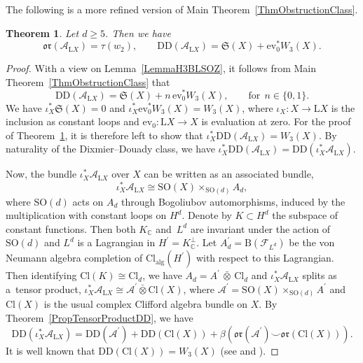 \documentclass[pdftex]{sigma}
\numberwithin{equation}{section}
\newtheorem{Theorem}{Theorem}[section]
\newcommand{\C}{\mathbb{C}}
\newcommand{\B}{\mathrm{B}}
\newcommand{\A}{\mathcal{A}}
\newcommand{\Cl}{\mathrm{Cl}}
\newcommand{\SO}{\mathrm{SO}}
\renewcommand{\L}{\mathrm{L}}
\newcommand{\DD}{\mathrm{DD}}
\newcommand{\oclass}{\mathfrak{or}}
\begin{document}
The following is a more refined version of Main Theorem~\ref{ThmObstructionClass}.

\begin{Theorem} \label{ThmRepeatedMain}
Let $d\geq 5$. Then we have
\begin{equation*}
\oclass(\A_{\L X}) = \tau(w_2), \qquad \DD(\A_{\L X}) = \mathfrak{S}(X) + \mathrm{ev}_0^*W_3(X).
\end{equation*}
\end{Theorem}

\begin{proof}
With a view on Lemma~\ref{LemmaH3BLSOZ}, it follows from Main Theorem~\ref{ThmObstructionClass} that
\begin{equation*}
\DD(\mathcal{A}_{\L X}) = \mathfrak{S}(X) + n \, \mathrm{ev}_0^*W_3(X), \qquad \text{for}~~n \in \{0, 1\}.
\end{equation*}
We have $\iota_X^* \mathfrak{S}(X) = 0$ and $\iota_X^*\mathrm{ev}_0^*W_3(X) = W_3(X)$, where $\iota_X \colon X \to \L X$ is the inclusion as constant loops and $\mathrm{ev}_0 \colon \L X \to X$ is evaluation at zero.
For the proof of Theorem~\ref{ThmRepeatedMain}, it is therefore left to show that $\iota_X^* \DD(\mathcal{A}_{\L X}) = W_3(X)$.
By naturality of the Dixmier--Douady class, we have $\iota_X^* \DD(\mathcal{A}_{\L X}) = \DD(\iota_X^*\mathcal{A}_{\L X})$.

Now, the bundle $\iota_X^*\mathcal{A}_{\L X}$ over $X$ can be written as an associated bundle,
\begin{equation*}
 \iota_X^*\mathcal{A}_{\L X} \cong \SO(X) \times_{\SO(d)} A_d,
\end{equation*}
where $\SO(d)$ acts on $A_d$ through Bogoliubov automorphisms, induced by the multiplication with constant loops on $H^d$.
Denote by $K\subset H^d$ the subspace of constant functions.
Then both $K_\C$ and~$L^d$ are invariant under the action of $\SO(d)$ and $L^d$ is a Lagrangian in $H^\prime = K_\C^\perp$.
Let $A_d^\prime = \B(\mathcal{F}_{L^d})$ be the von Neumann algebra completion of $\Cl_{\mathrm{alg}}(H^\prime)$ with respect to this Lagrangian.
Then identifying $\Cl(K) \cong \Cl_d$, we have $A_d = A^\prime \,\bar{\otimes}\, \Cl_d$ and $\iota_X^*\mathcal{A}_{\L X}$ splits as a~tensor product, $\iota_X^*\mathcal{A}_{\L X} \cong \mathcal{A}^\prime \bar{\otimes}\Cl(X)$, where $\mathcal{A}^\prime = \SO(X) \times_{\SO(d)} A^\prime$ and $\Cl(X)$ is the usual complex Clifford algebra bundle on $X$.
By Theorem~\ref{PropTensorProductDD}, we have
\begin{equation*}
 \DD(\iota_X^*\mathcal{A}_{\L X}) = \DD(\mathcal{A}^\prime) + \DD(\Cl(X)) + \beta(\oclass(\mathcal{A}^\prime) \smile \oclass(\Cl(X))).
\end{equation*}
It is well known that $\DD(\Cl(X)) = W_3(X)$ (see \cite[Lemma~7]{DonovanKaroubi} and \cite{MathaiMelroseSingerProjectiveFamilies}).


\end{proof}
\end{document}
